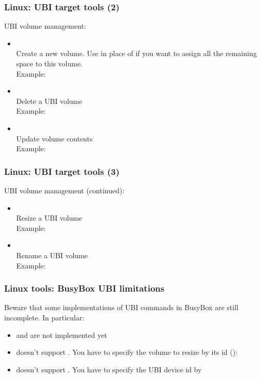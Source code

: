 \begin{frame}
  \frametitle{Linux: UBI target tools (2)}
  UBI volume management:
    \begin{itemize}
    \item {\small {}}\\
	Create a new volume. Use  in place of 
	if you want to assign all the remaining space to this volume.\\
        Example: 
    \item {\small {}}\\
	Delete a UBI volume\\
        Example: 
    \item {\small {}}\\
	Update volume contents\\
        Example: 
    \end{itemize}
\end{frame}

\begin{frame}
  \frametitle{Linux: UBI target tools (3)}
  UBI volume management (continued):
    \begin{itemize}
    \item {\small {}}\\
	Resize a UBI volume\\
        Example: 
    \item {\small {}}\\
	Rename a UBI volume\\
        Example: 
    \end{itemize}
\end{frame}

\begin{frame}
  \frametitle{Linux tools: BusyBox UBI limitations}
  Beware that some implementations of UBI commands in BusyBox are still
  incomplete. In particular:
  \begin{itemize}
    \item {} and  are not implemented yet
    \item {} doesn't support . You have
      to specify the volume to resize by its id ():\\
    \item {} doesn't support . You
      have to specify the UBI device id by 
    \end{itemize}
\end{frame}

